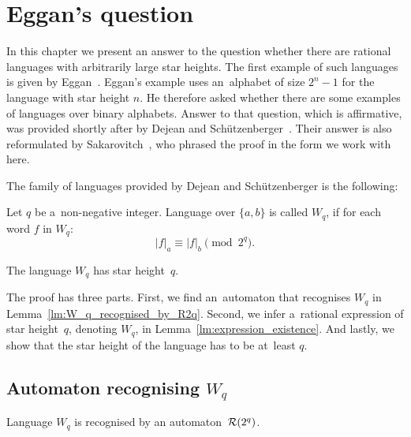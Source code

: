 \chapter{Eggan's question}

In this chapter we present an answer to the question whether there are rational languages with arbitrarily large star heights. The first example of such languages is given by Eggan~\cite{Eggan63}. Eggan's example uses an~alphabet of size $2^n - 1$ for the language with star height $n$. He therefore asked whether there are some examples of languages over binary alphabets. Answer to that question, which is affirmative, was provided shortly after by Dejean and Schützenberger~\cite{DejeanSchutzenberger66}. Their answer is also reformulated by Sakarovitch~\cite{Sakarovitch09}, who phrased the proof in the form we work with here.

The family of languages provided by Dejean and Schützenberger is the following:

\begin{defn}
    Let $q$ be a~non-negative integer. Language over $\{a, b\}$ is called $W_q$, if for each word $f$ in $W_q$:
    \[
        |f|_a \equiv |f|_b \pmod{2^q}.
    \]
\end{defn}

\begin{thm}\label{thm:main}
    The language $W_q$ has star height~$q$.
\end{thm}

The proof has three parts. First, we find an~automaton that recognises $W_q$ in Lemma~\ref*{lm:W_q_recognised_by_R2q}. Second, we infer a~rational expression of star height~$q$, denoting $W_q$, in Lemma~\ref*{lm:expression_existence}. And lastly, we show that the star height of the language has to be at~least $q$.

\section{Automaton recognising $W_q$}\label{section:automaton_recognising_W_q}

\begin{lemma}\label{lm:W_q_recognised_by_R2q}
    Language $W_q$ is recognised by an automaton~${\mathcal{R}}(2^q)$.
\end{lemma}

